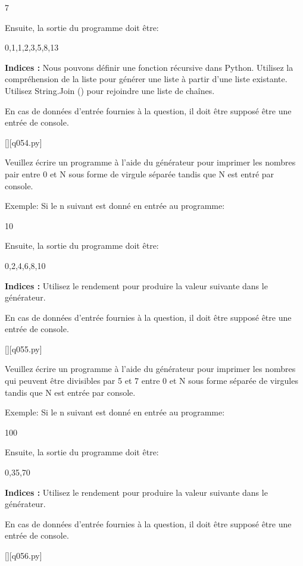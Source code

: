 7

Ensuite, la sortie du programme doit être:

0,1,1,2,3,5,8,13
\par
\textbf{Indices : }Nous pouvons définir une fonction récursive dans Python.
Utilisez la compréhension de la liste pour générer une liste à partir d'une liste existante.
Utilisez String.Join () pour rejoindre une liste de chaînes.

En cas de données d'entrée fournies à la question, il doit être supposé être une entrée de console.
\renewcommand{\nomfichier}{q054.py}
\begin{solution}
    \pythonfile{\chemincode \nomfichier}[][q054.py]
\end{solution}


\question
Veuillez écrire un programme à l'aide du générateur pour imprimer les nombres pair entre 0 et N sous forme de virgule séparée tandis que N est entré par console.

Exemple:
Si le n suivant est donné en entrée au programme:

10

Ensuite, la sortie du programme doit être:

0,2,4,6,8,10
\par
\textbf{Indices : }Utilisez le rendement pour produire la valeur suivante dans le générateur.

En cas de données d'entrée fournies à la question, il doit être supposé être une entrée de console.
\renewcommand{\nomfichier}{q055.py}
\begin{solution}
    \pythonfile{\chemincode \nomfichier}[][q055.py]
\end{solution}


\question
Veuillez écrire un programme à l'aide du générateur pour imprimer les nombres qui peuvent être divisibles par 5 et 7 entre 0 et N sous forme séparée de virgules tandis que N est entrée par console.

Exemple:
Si le n suivant est donné en entrée au programme:

100

Ensuite, la sortie du programme doit être:

0,35,70
\par
\textbf{Indices : }Utilisez le rendement pour produire la valeur suivante dans le générateur.

En cas de données d'entrée fournies à la question, il doit être supposé être une entrée de console.
\renewcommand{\nomfichier}{q056.py}
\begin{solution}
    \pythonfile{\chemincode \nomfichier}[][q056.py]
\end{solution}


